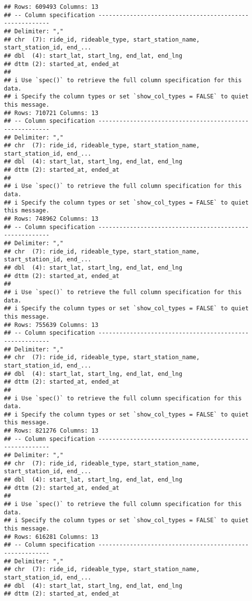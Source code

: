 \documentclass[
]{article}
\begin{document}
\begin{verbatim}
## Rows: 609493 Columns: 13
## -- Column specification --------------------------------------------------------
## Delimiter: ","
## chr  (7): ride_id, rideable_type, start_station_name, start_station_id, end_...
## dbl  (4): start_lat, start_lng, end_lat, end_lng
## dttm (2): started_at, ended_at
## 
## i Use `spec()` to retrieve the full column specification for this data.
## i Specify the column types or set `show_col_types = FALSE` to quiet this message.
## Rows: 710721 Columns: 13
## -- Column specification --------------------------------------------------------
## Delimiter: ","
## chr  (7): ride_id, rideable_type, start_station_name, start_station_id, end_...
## dbl  (4): start_lat, start_lng, end_lat, end_lng
## dttm (2): started_at, ended_at
## 
## i Use `spec()` to retrieve the full column specification for this data.
## i Specify the column types or set `show_col_types = FALSE` to quiet this message.
## Rows: 748962 Columns: 13
## -- Column specification --------------------------------------------------------
## Delimiter: ","
## chr  (7): ride_id, rideable_type, start_station_name, start_station_id, end_...
## dbl  (4): start_lat, start_lng, end_lat, end_lng
## dttm (2): started_at, ended_at
## 
## i Use `spec()` to retrieve the full column specification for this data.
## i Specify the column types or set `show_col_types = FALSE` to quiet this message.
## Rows: 755639 Columns: 13
## -- Column specification --------------------------------------------------------
## Delimiter: ","
## chr  (7): ride_id, rideable_type, start_station_name, start_station_id, end_...
## dbl  (4): start_lat, start_lng, end_lat, end_lng
## dttm (2): started_at, ended_at
## 
## i Use `spec()` to retrieve the full column specification for this data.
## i Specify the column types or set `show_col_types = FALSE` to quiet this message.
## Rows: 821276 Columns: 13
## -- Column specification --------------------------------------------------------
## Delimiter: ","
## chr  (7): ride_id, rideable_type, start_station_name, start_station_id, end_...
## dbl  (4): start_lat, start_lng, end_lat, end_lng
## dttm (2): started_at, ended_at
## 
## i Use `spec()` to retrieve the full column specification for this data.
## i Specify the column types or set `show_col_types = FALSE` to quiet this message.
## Rows: 616281 Columns: 13
## -- Column specification --------------------------------------------------------
## Delimiter: ","
## chr  (7): ride_id, rideable_type, start_station_name, start_station_id, end_...
## dbl  (4): start_lat, start_lng, end_lat, end_lng
## dttm (2): started_at, ended_at

\end{verbatim}
\end{document}
